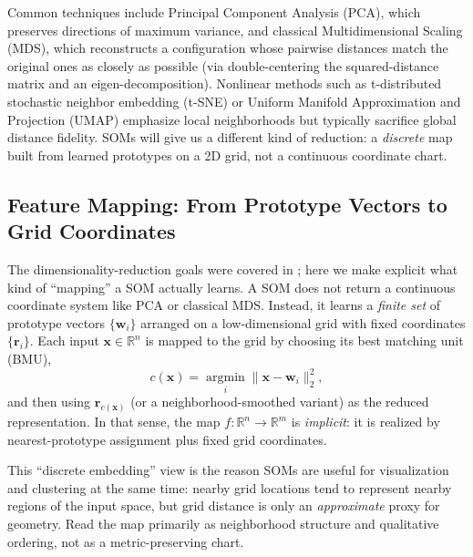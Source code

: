 Common techniques include Principal Component Analysis (PCA), which preserves directions of maximum variance, and classical Multidimensional Scaling (MDS), which reconstructs a configuration whose pairwise distances match the original ones as closely as possible (via double-centering the squared-distance matrix and an eigen-decomposition). Nonlinear methods such as t\hyp{}distributed stochastic neighbor embedding (t\hyp{}SNE) or Uniform Manifold Approximation and Projection (UMAP) emphasize local neighborhoods but typically sacrifice global distance fidelity. SOMs will give us a different kind of reduction: a \emph{discrete} map built from learned prototypes on a 2D grid, not a continuous coordinate chart.


\subsection{Feature Mapping: From Prototype Vectors to Grid Coordinates}
\label{sec:som_dimensionality_reduction_and_feature_mapping}

The dimensionality-reduction goals were covered in ; here we make explicit what kind of ``mapping'' a SOM actually learns. A SOM does not return a continuous coordinate system like PCA or classical MDS. Instead, it learns a \emph{finite set} of prototype vectors \(\{\mathbf{w}_i\}\) arranged on a low-dimensional grid with fixed coordinates \(\{\mathbf{r}_i\}\). Each input \(\mathbf{x}\in\mathbb{R}^n\) is mapped to the grid by choosing its best matching unit (BMU),
\[
c(\mathbf{x})=\operatorname*{argmin}_i \|\mathbf{x}-\mathbf{w}_i\|_2^2,
\]
and then using \(\mathbf{r}_{c(\mathbf{x})}\) (or a neighborhood-smoothed variant) as the reduced representation. In that sense, the map \(f:\mathbb{R}^n \to \mathbb{R}^m\) is \emph{implicit}: it is realized by nearest-prototype assignment plus fixed grid coordinates.

This ``discrete embedding'' view is the reason SOMs are useful for visualization and clustering at the same time: nearby grid locations tend to represent nearby regions of the input space, but grid distance is only an \emph{approximate} proxy for geometry. Read the map primarily as neighborhood structure and qualitative ordering, not as a metric-preserving chart.

